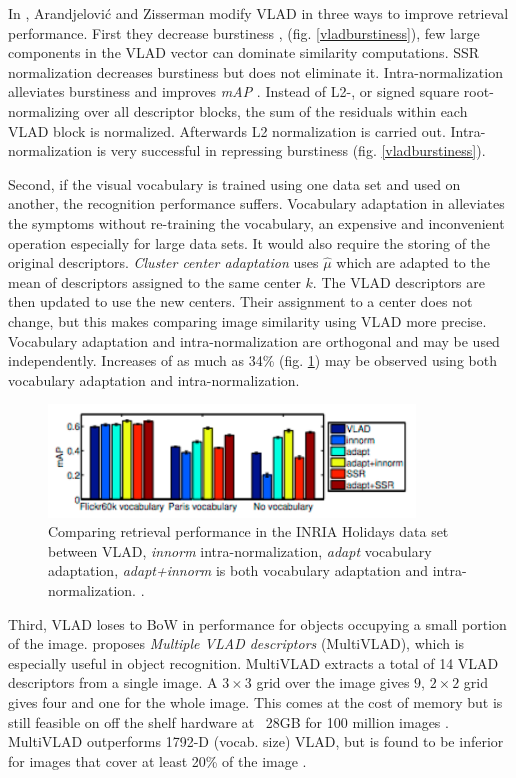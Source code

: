 \documentclass[english,12pt,a4paper,pdftex,elec,utf8, table]{aaltothesis}
\begin{document}
In \cite{Arandjelovic2013}, Arandjelovi\'{c} and Zisserman modify VLAD in three ways to improve retrieval performance. First they decrease burstiness \cite{Jegou2009}, \cite{Delhumeau2013} (fig. \ref{vladburstiness}), few large components in the VLAD vector can dominate similarity computations. SSR normalization decreases burstiness but does not eliminate it. Intra-normalization alleviates burstiness and improves \emph{mAP} \cite{Arandjelovic2013}. Instead of L2-, or signed square root-normalizing over all descriptor blocks, the sum of the residuals within each VLAD block is normalized. Afterwards L2 normalization is carried out. Intra-normalization is very successful in repressing burstiness (fig. \ref{vladburstiness}).

Second, if the visual vocabulary is trained using one data set and used on another, the recognition performance suffers. Vocabulary adaptation in \cite{Arandjelovic2013} alleviates the symptoms without re-training the vocabulary, an expensive and inconvenient operation especially for large data sets. It would also require the storing of the original descriptors. \emph{Cluster center adaptation} uses $\hat{\mu}$ which are adapted to the mean of descriptors assigned to the same center $k$. The VLAD descriptors are then updated to use the new centers. Their assignment to a center does not change, but this makes comparing image similarity using VLAD more precise. Vocabulary adaptation and intra-normalization are orthogonal and may be used independently. Increases of as much as 34\% (fig. \ref{vladadapt}) may be observed using both vocabulary adaptation and intra-normalization. \cite{Arandjelovic2013}

\begin{figure}[htb]
\begin{center}
\includegraphics[height=3cm]{figures/vladadapt}
\end{center}
\caption{Comparing retrieval performance in the INRIA Holidays data set between VLAD, \emph{innorm} intra-normalization, \emph{adapt} vocabulary adaptation, \emph{adapt+innorm} is both vocabulary adaptation and intra-normalization. \cite{Arandjelovic2013}.}
\label{vladadapt}
\end{figure}
Third, VLAD loses to BoW in performance for objects occupying a small portion of the image. \cite{Arandjelovic2013} proposes \emph{Multiple VLAD descriptors} (MultiVLAD), which is especially useful in object recognition. MultiVLAD extracts a total of 14 VLAD descriptors from a single image. A $3 \times 3$ grid over the image gives $9$, $2 \times 2$ grid gives four and one for the whole image. This comes at the cost of memory but is still feasible on off the shelf hardware at ~28GB for 100 million images \cite{Arandjelovic2013}. MultiVLAD outperforms 1792-D (vocab. size) VLAD, but is found to be inferior for images that cover at least 20\% of the image \cite{Arandjelovic2013}.
\end{document}
